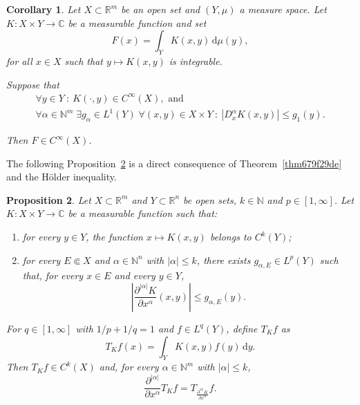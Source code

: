 \documentclass[a4paper,9pt]{amsart}
\newcommand{\N}{\mathbb{N}}	%
\newcommand{\R}{\mathbb{R}}	%
\newcommand{\C}{\mathbb{C}}	%
\newcommand{\did}{\,\mathrm{d}}	%
\newcommand{\de}{\partial}		%
\newcommand{\abs}[1]{\left\lvert #1 \right\rvert}
\theoremstyle{plain}
\newtheorem{proposition}{Proposition}[section]
\newtheorem{corollary}[proposition]{Corollary}
\theoremstyle{definition}
\theoremstyle{remark}
\begin{document}
\begin{corollary}\label{cor67b2f278}
	Let $X\subset\R^m$ be an open set and $(Y,\mu)$ a measure space.
	Let $K:X\times Y\to\C$ be a measurable function and set 
	\begin{equation}
		F(x) = \int_Y K(x,y) \did\mu(y) ,
	\end{equation}
	for all $x\in X$ such that $y\mapsto K(x,y)$ is integrable.
	
	Suppose that
	\begin{equation}\label{eq67b2f2bb}
	\begin{array}{c}
		\forall y\in Y
		\ :\   K(\cdot,y)\in C^\infty(X),
		\text{ and }\\
	\forall\alpha\in\N^m\;\exists g_\alpha\in L^1(Y)\;\forall (x,y)\in X\times Y 
		\ :\ |D^\alpha_xK(x,y)| \le g_1(y) .
	\end{array}
	\end{equation}
	
	Then $F\in C^\infty(X)$.
\end{corollary}

The following Proposition~\ref{prop6798f690} is a direct consequence of Theorem~\ref{thm679f29de}
and the Hölder inequality.

\begin{proposition}\label{prop6798f690}
	Let $X\subset\R^m$ and $Y\subset\R^n$ be open sets, $k\in\N$ and $p\in[1,\infty]$.
	Let $K:X\times Y\to\C$ be a measurable function such that:
	\begin{enumerate}
	\item	for every $y\in Y$, the function $x\mapsto K(x,y)$ belongs to $C^k(Y)$;
	\item	for every $E\Subset X$ and $\alpha\in\N^n$ with $|\alpha|\le k$, there exists $g_{\alpha,E}\in L^p(Y)$ such that, for every $x\in E$ and every $y\in Y$,
	\[
	\left|\frac{\de^{|\alpha|} K}{\de x^\alpha}(x,y)\right| \le g_{\alpha,E} (y) .
	\]
	\end{enumerate}
	
	For $q\in[1,\infty]$ with $1/p+1/q=1$ and $f\in L^q(Y)$, define $T_Kf$ as
	\[
	T_Kf (x) = \int_Y K(x,y) f(y) \did y .
	\]
	Then $T_Kf\in C^k(X)$ and, for every $\alpha\in\N^m$ with $|\alpha|\le k$,
	\begin{equation}\label{eq6798ef4d}
	\frac{\de^{\abs{\alpha}}}{\de x^\alpha} T_Kf = T_{\frac{\de^{\abs{\alpha}}K}{\de x^\alpha}} f .
	\end{equation}
\end{proposition}
\end{document}
